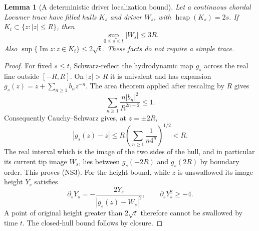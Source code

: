 \documentclass[11pt]{article}
\newtheorem{lemma}[theorem]{Lemma}
\theoremstyle{definition}\newtheorem{definition}[theorem]{Definition}
\theoremstyle{remark}\newtheorem{remark}[theorem]{Remark}
\begin{document}
\begin{lemma}[A deterministic driver localization bound]
\label{lem:ns-driver-disk}
Let a continuous chordal Loewner trace have filled hulls $K_s$ and
driver $W_s$, with $\operatorname{hcap}(K_s)=2s$. If
$K_t\subset\{z:|z|\le R\}$, then
\[
 \sup_{0\le s\le t}|W_s|\le3R.
 \tag{NS3}
\]
Also $\sup\{\operatorname{Im}z:z\in K_t\}\le2\sqrt t$.
These facts do not require a simple trace.
\end{lemma}
\begin{proof}
For fixed $s\le t$, Schwarz-reflect the hydrodynamic map $g_s$
across the real line outside $[-R,R]$. On $|z|>R$ it is univalent
and has expansion $g_s(z)=z+\sum_{n\ge1}b_nz^{-n}$.
The area theorem applied after rescaling by $R$ gives
\[
 \sum_{n\ge1}\frac{n|b_n|^2}{R^{2n+2}}\le1.
\]
Consequently Cauchy--Schwarz gives, at $z=\pm2R$,
\[
 |g_s(z)-z|\le R\left(\sum_{n\ge1}\frac1{n4^n}\right)^{1/2}<R.
\]
The real interval which is the image of the two sides of the hull,
and in particular its current tip image $W_s$, lies between
$g_s(-2R)$ and $g_s(2R)$ by boundary order. This proves (NS3).
For the height bound, while $z$ is unswallowed its image height $Y_s$
satisfies
\[
 \partial_sY_s=-\frac{2Y_s}{|g_s(z)-W_s|^2},\qquad
 \partial_sY_s^2\ge-4.
\]
A point of original height greater than $2\sqrt t$ therefore cannot
be swallowed by time $t$. The closed-hull bound follows by closure.
\end{proof}
\end{document}

